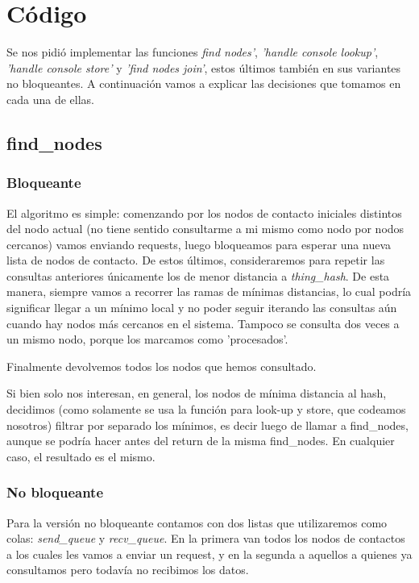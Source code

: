 \section{Código}
Se nos pidió implementar las funciones \emph{find nodes'}, \emph{'handle console lookup'}, \emph{'handle console store'} y \emph{'find nodes join'}, estos últimos también en sus variantes no bloqueantes. A continuación vamos a explicar las decisiones que tomamos en cada una de ellas.

    \subsection{find\_nodes}
        \subsubsection{Bloqueante}
            El algoritmo es simple: comenzando por los nodos de contacto iniciales distintos del nodo actual (no tiene sentido consultarme a mi mismo como nodo por nodos cercanos) vamos enviando requests, luego bloqueamos para esperar una nueva lista de nodos de contacto. De estos últimos, consideraremos para repetir las consultas anteriores únicamente los de menor distancia a \emph{thing\_hash}. De esta manera, siempre vamos a recorrer las ramas de mínimas distancias, lo cual podría significar llegar a un mínimo local y no poder seguir iterando las consultas aún cuando hay nodos más cercanos en el sistema.
            Tampoco se consulta dos veces a un mismo nodo, porque los marcamos como 'procesados'.

            Finalmente devolvemos todos los nodos que hemos consultado.

            Si bien solo nos interesan, en general, los nodos de mínima distancia al hash, decidimos (como solamente se usa la función para look-up y store, que codeamos nosotros) filtrar por separado los mínimos, es decir luego de llamar a find\_nodes, aunque se podría hacer antes del return de la misma find\_nodes. En cualquier caso, el resultado es el mismo.
        \subsubsection{No bloqueante}
            Para la versión no bloqueante contamos con dos listas que utilizaremos como colas: \emph{send\_queue} y \emph{recv\_queue}. En la primera van todos los nodos de contactos a los cuales les vamos a enviar un request, y en la segunda a aquellos a quienes ya consultamos pero todavía no recibimos los datos.

